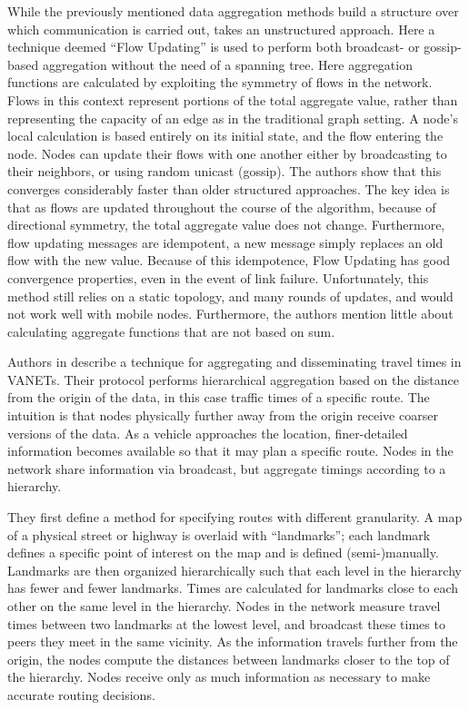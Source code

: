 \documentclass{IEEEtran}
\begin{document}
While the previously mentioned data aggregation methods build a structure over which communication is carried out, \cite{flow} takes an unstructured approach. Here a technique deemed “Flow Updating” is used to perform both broadcast- or gossip-based aggregation without the need of a spanning tree. Here aggregation functions are calculated by exploiting the symmetry of flows in the network. Flows in this context represent portions of the total aggregate value, rather than representing the capacity of an edge as in the traditional graph setting. A node’s local calculation is based entirely on its initial state, and the flow entering the node. Nodes can update their flows with one another either by broadcasting to their neighbors, or using random unicast (gossip). The authors show that this converges considerably faster than older structured approaches. The key idea is that as flows are updated throughout the course of the algorithm, because of directional symmetry, the total aggregate value does not change. Furthermore, flow updating messages are idempotent, a new message simply replaces an old flow with the new value. Because of this idempotence, Flow Updating has good convergence properties, even in the event of link failure. Unfortunately, this method still relies on a static topology, and many rounds of updates, and would not work well with mobile nodes. Furthermore, the authors mention little about calculating aggregate functions that are not based on sum.

Authors in \cite{landmark} describe a technique for aggregating and disseminating travel times in VANETs. Their protocol performs hierarchical aggregation based on the distance from the origin of the data, in this case traffic times of a specific route. The intuition is that nodes physically further away from the origin receive coarser versions of the data. As a vehicle approaches the location, finer-detailed information becomes available so that it may plan a specific route. Nodes in the network share information via broadcast, but aggregate timings according to a hierarchy.

They first define a method for specifying routes with different granularity. A map of a physical street or highway is overlaid with “landmarks”; each landmark defines a specific point of interest on the map and is defined (semi-)manually. Landmarks are then organized hierarchically such that each level in the hierarchy has fewer and fewer landmarks. Times are calculated for landmarks close to each other on the same level in the hierarchy. Nodes in the network measure travel times between two landmarks at the lowest level, and broadcast these times to peers they meet in the same vicinity. As the information travels further from the origin, the nodes compute the distances between landmarks closer to the top of the hierarchy.  Nodes receive only as much information as necessary to make accurate routing decisions.
\end{document}
